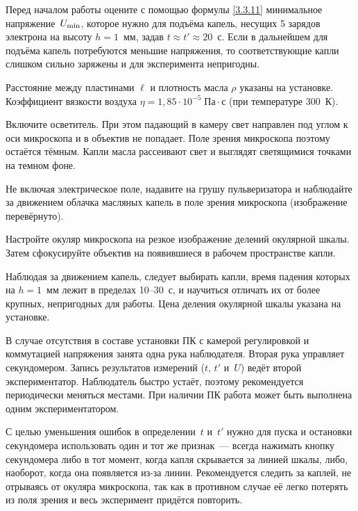 \begin{lab:task}

    
\item Перед началом работы оцените с помощью формулы \eqref{3.3.11} 
минимальное напряжение~$U_{\rm min}$, которое нужно для подъёма капель, 
несущих 5 зарядов электрона на высоту $h=1$~мм, задав $t\approx t' \approx 20$~с. 
Если в дальнейшем для подъёма капель потребуются меньшие напряжения, 
то соответствующие капли слишком сильно заряжены и для эксперимента непригодны.

Расстояние между пластинами $\ell$ и плотность масла $\rho$ указаны на установке.
Коэффициент вязкости воздуха $\eta=1,85\cdot 10^{-5}\;\text{Па}\cdot \text{с}$
(при температуре 300~К).

\item Включите осветитель. При этом падающий в камеру свет направлен под углом к
оси микроскопа и в объектив не попадает. Поле зрения микроскопа поэтому 
остаётся тёмным. Капли масла рассеивают свет и 
выглядят светящимися точками на темном фоне.

Не включая электрическое поле,  надавите на грушу
пульверизатора  и наблюдайте за движением облачка масляных капель в поле зрения
микроскопа (изображение перевёрнуто).

\item Настройте окуляр микроскопа на резкое изображение делений окулярной шкалы.
Затем сфокусируйте объектив на появившиеся в рабочем пространстве капли.

\item Наблюдая за движением капель, следует выбирать капли, время падения
которых на $h=1$~мм лежит в пределах 10--30~с, и научиться отличать 
их от более крупных, непригодных для работы. Цена деления окулярной шкалы 
указана на установке.

В случае отсутствия в составе установки ПК с камерой регулировкой и коммутацией
напряжения занята одна рука наблюдателя. Вторая рука управляет секундомером.
Запись результатов измерений ($t$, $t'$ и~$U$) ведёт второй экспериментатор.
Наблюдатель быстро устаёт, поэтому рекомендуется периодически меняться местами.
При наличии ПК работа может быть выполнена одним экспериментатором.

С целью уменьшения ошибок в определении~$t$ и~$t'$ нужно для пуска и остановки
секундомера использовать один и тот же признак~--- всегда нажимать 
кнопку секундомера либо в тот момент, когда капля скрывается за линией шкалы, либо,
наоборот, когда она появляется из-за линии. Рекомендуется следить за каплей, не
отрываясь от окуляра микроскопа, так как в противном случае её легко потерять из
поля зрения и весь эксперимент придётся повторить.


\end{lab:task}
